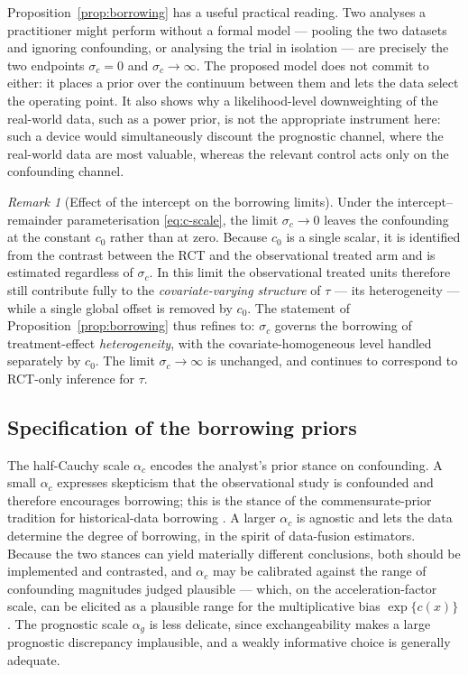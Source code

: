 \documentclass[11pt]{report}
\theoremstyle{plain}
\theoremstyle{definition}
\theoremstyle{remark}
\newcommand{\1}{\mathds{1}}
\theoremstyle{plain}
\theoremstyle{remark}
\newtheorem{remark}[theorem]{Remark}
\begin{document}
Proposition~\ref{prop:borrowing} has a useful practical reading. Two analyses a
practitioner might perform without a formal model --- pooling the two datasets
and ignoring confounding, or analysing the trial in isolation --- are precisely
the two endpoints $\sigma_c = 0$ and $\sigma_c \to \infty$. The proposed model
does not commit to either: it places a prior over the continuum between them and
lets the data select the operating point. It also shows why a likelihood-level
downweighting of the real-world data, such as a power prior, is not the
appropriate instrument here: such a device would simultaneously discount the
prognostic channel, where the real-world data are most valuable, whereas the
relevant control acts only on the confounding channel.

\begin{remark}[Effect of the intercept on the borrowing limits]
\label{rem:intercept-borrowing}
Under the intercept--remainder parameterisation \eqref{eq:c-scale}, the limit
$\sigma_c \to 0$ leaves the confounding at the constant $c_0$ rather than at
zero. Because $c_0$ is a single scalar, it is identified from the contrast
between the RCT and the observational treated arm and is estimated regardless of
$\sigma_c$. In this limit the observational treated units therefore still
contribute fully to the \emph{covariate-varying structure} of $\tau$ --- its
heterogeneity --- while a single global offset is removed by $c_0$. The
statement of Proposition~\ref{prop:borrowing} thus refines to: $\sigma_c$ governs
the borrowing of treatment-effect \emph{heterogeneity}, with the
covariate-homogeneous level handled separately by $c_0$. The limit
$\sigma_c \to \infty$ is unchanged, and continues to correspond to RCT-only
inference for $\tau$.
\end{remark}

\subsection{Specification of the borrowing priors}

The half-Cauchy scale $\alpha_c$ encodes the analyst's prior stance on
confounding. A small $\alpha_c$ expresses skepticism that the observational
study is confounded and therefore encourages borrowing; this is the stance of
the commensurate-prior tradition for historical-data borrowing
\citep{hobbs2011}. A larger $\alpha_c$ is agnostic and lets the data determine
the degree of borrowing, in the spirit of data-fusion estimators. Because the
two stances can yield materially different conclusions, both should be
implemented and contrasted, and $\alpha_c$ may be calibrated against the range
of confounding magnitudes judged plausible --- which, on the acceleration-factor
scale, can be elicited as a plausible range for the multiplicative bias
$\exp\{c(x)\}$. The prognostic scale $\alpha_g$ is less delicate, since
exchangeability makes a large prognostic discrepancy implausible, and a weakly
informative choice is generally adequate.
\end{document}
